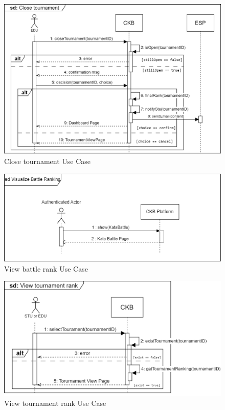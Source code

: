 \begin{figure}[H]
    \centering
    \includegraphics[width=1\textwidth]{images/sequence_diagrams/.png/Close_Tournament - UC11.png}
    \caption{Close tournament Use Case}
    \label{fig:uc11}
\end{figure}
\begin{figure}[H]
    \centering
    \includegraphics[width=1\textwidth]{images/sequence_diagrams/ClassDiagram-UC12-SequenceDiagram.png}
    \caption{View battle rank Use Case}
    \label{fig:uc12}
\end{figure}
\begin{figure}[H]
    \centering
    \includegraphics[width=1\textwidth]{images/sequence_diagrams/.png/View_Tournament_Rank - UC13.png}
    \caption{View tournament rank Use Case}
    \label{fig:uc13}
\end{figure}
